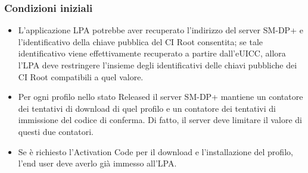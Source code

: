 \documentclass[10pt, oneside]{book}
\begin{document}
\subsubsection{Condizioni iniziali}
\begin{itemize}
\item L'applicazione LPA potrebbe aver recuperato l'indirizzo del server SM-DP+ e l'identificativo della chiave pubblica del CI Root consentita; se tale identificativo viene effettivamente recuperato a partire dall'eUICC, allora l'LPA deve restringere l'insieme degli identificativi delle chiavi pubbliche dei CI Root compatibili a quel valore.
\item Per ogni profilo nello stato Released il server SM-DP+ mantiene un contatore dei tentativi di download di quel profilo e un contatore dei tentativi di immissione del codice di conferma. Di fatto, il server deve limitare il valore di questi due contatori.
\item Se è richiesto l'Activation Code per il download e l'installazione del profilo, l'end user deve averlo già immesso all'LPA.
\end{itemize}
\end{document}
